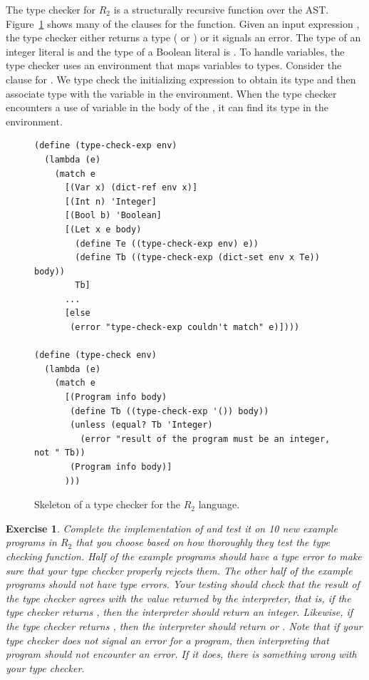 \documentclass[11pt]{book}
\newtheorem{exercise}[theorem]{Exercise}
\begin{document}
The type checker for $R_2$ is a structurally recursive function over
the AST. Figure~\ref{fig:type-check-R2} shows many of the clauses for
the  function.  Given an input expression
, the type checker either returns a type ( or
) or it signals an error.  The type of an integer literal
is  and the type of a Boolean literal is .
To handle variables, the type checker uses an environment that maps
variables to types. Consider the clause for .  We type check
the initializing expression to obtain its type  and then
associate type  with the variable  in the
environment. When the type checker encounters a use of variable
 in the body of the , it can find its type in the
environment.

\begin{figure}[tbp]
\begin{lstlisting}
(define (type-check-exp env)
  (lambda (e)
    (match e
      [(Var x) (dict-ref env x)]
      [(Int n) 'Integer]
      [(Bool b) 'Boolean]
      [(Let x e body)
        (define Te ((type-check-exp env) e))
        (define Tb ((type-check-exp (dict-set env x Te)) body))
        Tb]
      ...
      [else
       (error "type-check-exp couldn't match" e)])))

(define (type-check env)
  (lambda (e)
    (match e
      [(Program info body)
       (define Tb ((type-check-exp '()) body))
       (unless (equal? Tb 'Integer)
         (error "result of the program must be an integer, not " Tb))
       (Program info body)]
      )))
\end{lstlisting}
\caption{Skeleton of a type checker for the $R_2$ language.}
\label{fig:type-check-R2}
\end{figure}

\begin{exercise}\normalfont
Complete the implementation of  and test it on 10
new example programs in $R_2$ that you choose based on how thoroughly
they test the type checking function. Half of the example programs
should have a type error to make sure that your type checker properly
rejects them. The other half of the example programs should not have
type errors. Your testing should check that the result of the type
checker agrees with the value returned by the interpreter, that is, if
the type checker returns , then the interpreter should
return an integer. Likewise, if the type checker returns
, then the interpreter should return  or
. Note that if your type checker does not signal an error
for a program, then interpreting that program should not encounter an
error.  If it does, there is something wrong with your type checker.
\end{exercise}
\end{document}
